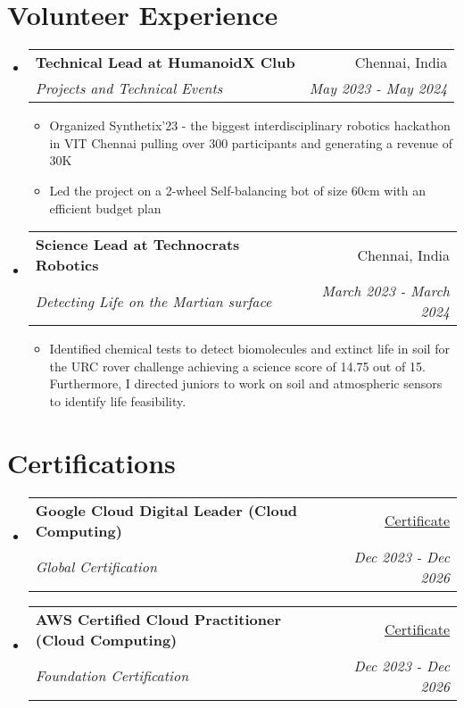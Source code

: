 \documentclass[a4paper,20pt]{article}
\makeatletter
\newcommand{\resumeItemWithoutColon}[2]{
  \item\small{ #2 \vspace{-2pt}}
}
\newcommand{\resumeSubheading}[4]{
  \vspace{-1pt}\item
    \begin{tabular*}{0.97\textwidth}{l@{\extracolsep{\fill}}r}
      \textbf{#1} & #2 \\
      \textit{#3} & \textit{#4} \\
    \end{tabular*}\vspace{-5pt}
}
\newcommand{\resumeSubHeadingListStart}{\begin{itemize}[leftmargin=*]}
\newcommand{\resumeSubHeadingListEnd}{\end{itemize}}
\newcommand{\resumeItemListStart}{\begin{itemize}}
\newcommand{\resumeItemListEnd}{\end{itemize}\vspace{-5pt}}
\makeatother
\begin{document}
\section{Volunteer Experience}
  \resumeSubHeadingListStart
	\resumeSubheading
    {Technical Lead at HumanoidX Club}{Chennai, India}
    {Projects and Technical Events}{May 2023 - May 2024}
    \resumeItemListStart
        \resumeItemWithoutColon{}{Organized Synthetix’23 - the biggest interdisciplinary robotics hackathon in VIT Chennai pulling over 300 participants and generating a revenue of 30K}
        \resumeItemWithoutColon{}{Led the project on a 2-wheel Self-balancing bot of size 60cm with an efficient budget plan}
      \resumeItemListEnd
\vspace{5pt}
    \resumeSubheading
    {Science Lead at Technocrats Robotics}{Chennai, India}
    {Detecting Life on the Martian surface}{March 2023 - March 2024}
    \resumeItemListStart
        \resumeItemWithoutColon{}{Identified chemical tests to detect biomolecules and extinct life in soil for the URC rover challenge achieving a science score of 14.75 out of 15. Furthermore, I directed juniors to work on soil and atmospheric sensors to identify life feasibility.}
    \resumeItemListEnd
\resumeSubHeadingListEnd
\section{Certifications}
  \resumeSubHeadingListStart
    \resumeSubheading
    {Google Cloud Digital Leader (Cloud Computing)}{\href{https://drive.google.com/file/d/1yrar0l8pqGjKomXAJhlzxpLaDC1J4h2B/view?usp=drive_link}{Certificate}}
    {Global Certification}{Dec 2023 - Dec 2026}
    \vspace{-2pt}
    \resumeSubheading
    {AWS Certified Cloud Practitioner (Cloud Computing)}{\href{https://drive.google.com/file/d/1fHfk6Y0M7gjuyt5abAbUEOhVx3xjZCgf/view?usp=drive_link}{Certificate}}
    {Foundation Certification}{Dec 2023 - Dec 2026}
\resumeSubHeadingListEnd
\end{document}
